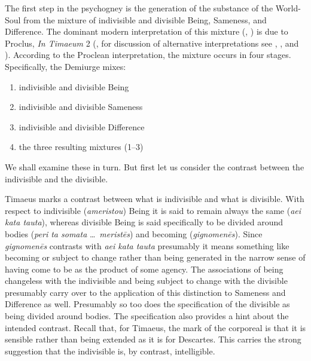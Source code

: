 The first step in the psychogney is the generation of the substance of the World-Soul from the mixture of indivisible and divisible Being, Sameness, and Difference. The dominant modern interpretation of this mixture (\citealt{Grube:1932qr}, \citealt[60--1]{Cornford:1935fk} \citealt[70--1]{Robinson:1970lq}) is due to Proclus, \emph{In Timaeum} 2 (\citealt{Diehl:1903re}, for discussion of alternative interpretations see \citealt[106--36]{Taylor:1928qb}, \citealt[51--54]{Shorey:1889sx}, and \citealt[352]{Shorey:1928ar}). According to the Proclean interpretation, the mixture occurs in four stages. Specifically, the Demiurge mixes:
\begin{enumerate}[(1)]
	\item indivisible and divisible Being
	\item indivisible and divisible Sameness
	\item indivisible and divisible Difference
	\item the three resulting mixtures (1--3)
\end{enumerate} 
We shall examine these in turn. But first let us consider the contrast between the indivisible and the divisible.

Timaeus marks a contrast between what is indivisible and what is divisible. With respect to indivisible (\emph{ameristou}) Being it is said to remain always the same (\emph{aei kata tauta}), whereas divisible Being is said specifically to be divided around bodies (\emph{peri ta somata} \ldots\ \emph{meristēs}) and becoming (\emph{gignomenēs}). Since \emph{gignomenēs} contrasts with \emph{aei kata tauta} presumably it means something like becoming or subject to change rather than being generated in the narrow sense of having come to be as the product of some agency. The associations of being changeless with the indivisible and being subject to change with the divisible presumably carry over to the application of this distinction to Sameness and Difference as well. Presumably so too does the specification of the divisible as being divided around bodies. The specification also provides a hint about the intended contrast. Recall that, for Timaeus, the mark of the corporeal is that it is sensible rather than being extended as it is for Descartes. This carries the strong suggestion that the indivisible is, by contrast, intelligible.


